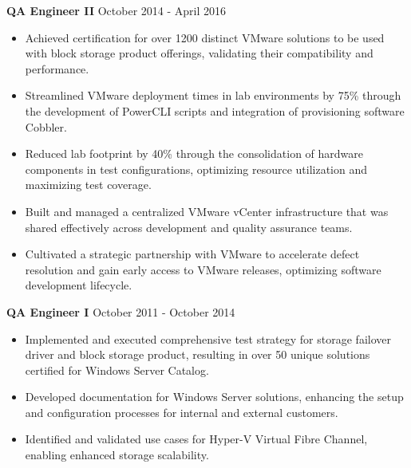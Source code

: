 \documentclass[11pt]{article}       %
\begin{document}
\textbf{QA Engineer II} \hfill October 2014 - April 2016 \\
\vspace{-9pt}
\begin{itemize}
  \item Achieved certification for over 1200 distinct VMware solutions to be used with block storage product offerings, validating their compatibility and performance.
  \item Streamlined VMware deployment times in lab environments by 75\% through the development of PowerCLI scripts and integration of provisioning software Cobbler.
  \item Reduced lab footprint by 40\% through the consolidation of hardware components in test configurations, optimizing resource utilization and maximizing test coverage.
  \item Built and managed a centralized VMware vCenter infrastructure that was shared effectively across development and quality assurance teams.
  \item Cultivated a strategic partnership with VMware to accelerate defect resolution and gain early access to VMware releases, optimizing software development lifecycle.
\end{itemize}

\textbf{QA Engineer I} \hfill October 2011 - October 2014 \\
\vspace{-9pt}
\begin{itemize}
  \item Implemented and executed comprehensive test strategy for storage failover driver and block storage product, resulting in over 50 unique solutions certified for Windows Server Catalog.
  \item Developed documentation for Windows Server solutions, enhancing the setup and configuration processes for internal and external customers.
  \item Identified and validated use cases for Hyper-V Virtual Fibre Channel, enabling enhanced storage scalability.
\end{itemize}
\end{document}
